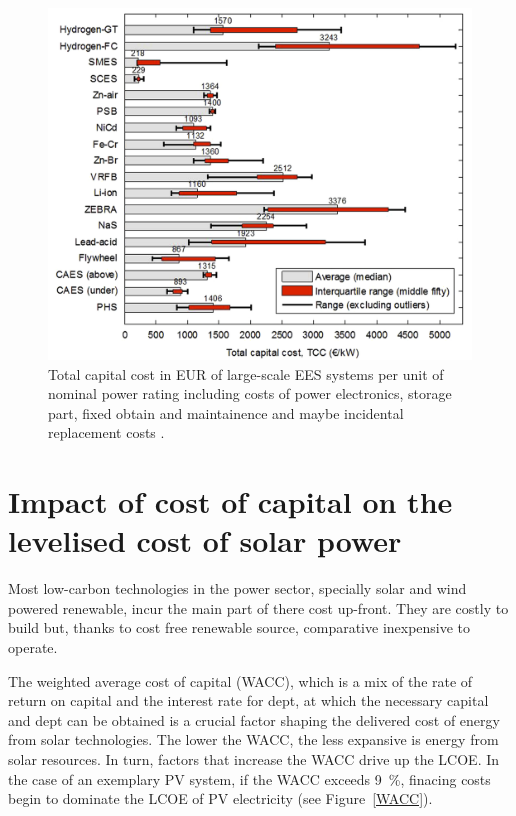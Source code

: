 \begin{figure}[htbp]  
\centering
\includegraphics[width=0.65\linewidth]{FIG/TCC_EES}
\caption[Total capital cost in EUR of large-scale EES systems per unit of nominal power rating including costs of power electronics, storage part, fixed obtain and maintainence and maybe incidental replacement costs.]{Total capital cost in EUR of large-scale EES systems per unit of nominal power rating including costs of power electronics, storage part, fixed obtain and maintainence and maybe incidental replacement costs \cite{Zakeri2015}.}\label{TCC_EES}
\end{figure}
\section{Impact of cost of capital on the levelised cost of solar power} \label{section WACC}
Most low-carbon technologies in the power sector, specially solar and wind powered renewable, incur the main part of there cost up-front. They are costly to build but, thanks to cost free renewable source, comparative inexpensive to operate.

The weighted average cost of capital (WACC), which is a mix of the  rate of return on capital and the interest rate for dept, at which the necessary capital and dept can be obtained is a crucial factor shaping the delivered cost of energy from solar technologies. The lower the WACC, the less expansive is energy from solar resources. In turn, factors that increase the WACC drive up the LCOE. In the case of an exemplary PV system, if the WACC exceeds \SI{9}{\percent}, finacing costs begin to dominate the LCOE of PV electricity (see Figure~\ref{WACC}). 

